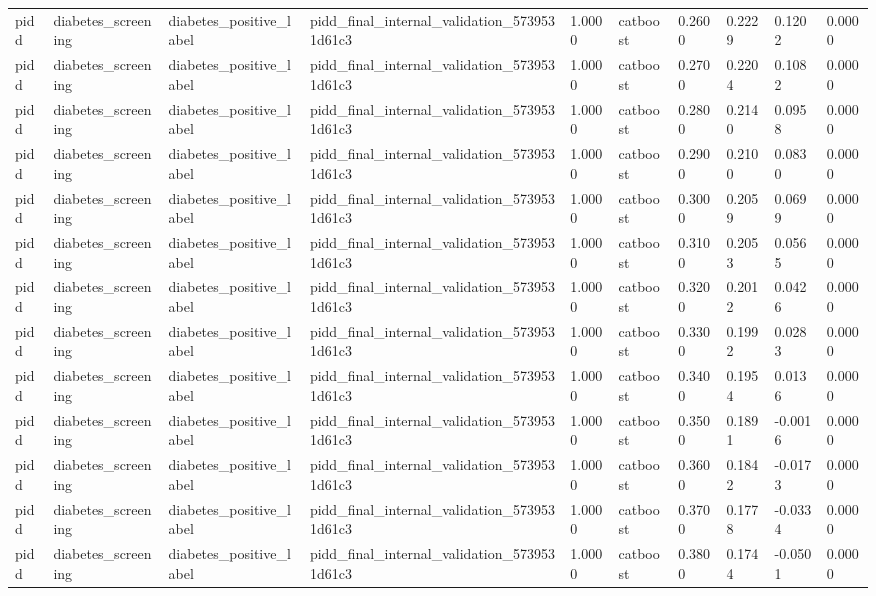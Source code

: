 \begin{tabular}{llllllllll}
pidd & diabetes\_screening & diabetes\_positive\_label & pidd\_final\_internal\_validation\_5739531d61c3 & 1.0000 & catboost & 0.2600 & 0.2229 & 0.1202 & 0.0000 \\
pidd & diabetes\_screening & diabetes\_positive\_label & pidd\_final\_internal\_validation\_5739531d61c3 & 1.0000 & catboost & 0.2700 & 0.2204 & 0.1082 & 0.0000 \\
pidd & diabetes\_screening & diabetes\_positive\_label & pidd\_final\_internal\_validation\_5739531d61c3 & 1.0000 & catboost & 0.2800 & 0.2140 & 0.0958 & 0.0000 \\
pidd & diabetes\_screening & diabetes\_positive\_label & pidd\_final\_internal\_validation\_5739531d61c3 & 1.0000 & catboost & 0.2900 & 0.2100 & 0.0830 & 0.0000 \\
pidd & diabetes\_screening & diabetes\_positive\_label & pidd\_final\_internal\_validation\_5739531d61c3 & 1.0000 & catboost & 0.3000 & 0.2059 & 0.0699 & 0.0000 \\
pidd & diabetes\_screening & diabetes\_positive\_label & pidd\_final\_internal\_validation\_5739531d61c3 & 1.0000 & catboost & 0.3100 & 0.2053 & 0.0565 & 0.0000 \\
pidd & diabetes\_screening & diabetes\_positive\_label & pidd\_final\_internal\_validation\_5739531d61c3 & 1.0000 & catboost & 0.3200 & 0.2012 & 0.0426 & 0.0000 \\
pidd & diabetes\_screening & diabetes\_positive\_label & pidd\_final\_internal\_validation\_5739531d61c3 & 1.0000 & catboost & 0.3300 & 0.1992 & 0.0283 & 0.0000 \\
pidd & diabetes\_screening & diabetes\_positive\_label & pidd\_final\_internal\_validation\_5739531d61c3 & 1.0000 & catboost & 0.3400 & 0.1954 & 0.0136 & 0.0000 \\
pidd & diabetes\_screening & diabetes\_positive\_label & pidd\_final\_internal\_validation\_5739531d61c3 & 1.0000 & catboost & 0.3500 & 0.1891 & -0.0016 & 0.0000 \\
pidd & diabetes\_screening & diabetes\_positive\_label & pidd\_final\_internal\_validation\_5739531d61c3 & 1.0000 & catboost & 0.3600 & 0.1842 & -0.0173 & 0.0000 \\
pidd & diabetes\_screening & diabetes\_positive\_label & pidd\_final\_internal\_validation\_5739531d61c3 & 1.0000 & catboost & 0.3700 & 0.1778 & -0.0334 & 0.0000 \\
pidd & diabetes\_screening & diabetes\_positive\_label & pidd\_final\_internal\_validation\_5739531d61c3 & 1.0000 & catboost & 0.3800 & 0.1744 & -0.0501 & 0.0000 \\

\end{tabular}
